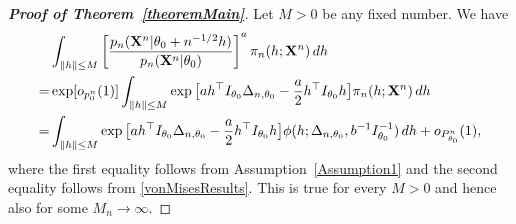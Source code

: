 \documentclass[11pt]{article}
\theoremstyle{plain}
\theoremstyle{definition}
\theoremstyle{remark}
\begin{document}
\begin{appendices}
\begin{proof}[\textbf{Proof of Theorem~\ref{theoremMain}}]
    Let $M>0$ be any fixed number.
    We have
\begin{equation}\label{eq:8}
    \begin{split}
    &\int_{\|h\|\leq M} \left[\frac{p_n(\mathbf{X}^{n}|\theta_0+n^{-1/2}h)}{p_n(\mathbf{X}^{n}|\theta_0)}\right]^a \pi_n (h;\mathbf{X}^{n}) \, dh\\
    =&
    \exp [o_{p^n_0}(1)]\int_{\|h\|\leq M} \exp\big[ a h^\top  I_{\theta_0}\Delta_{n,\theta_0}- \frac{a}{2}h^\top  I_{\theta_0}h\big]\pi_n (h;\mathbf{X}^{n}) \, dh
    \\
    =&\int_{\|h\|\leq M} \exp\big[ a h^\top  I_{\theta_0}\Delta_{n,\theta_0}-\frac{a}{2}h^\top  I_{\theta_0}h\big] \phi(h;\Delta_{n,\theta_0}, b^{-1} I_{\theta_0}^{-1})\, dh
    +o_{P^n_{\theta_0}}(1),
\end{split}
\end{equation}
where the first equality follows from Assumption~\ref{Assumption1} and the second equality follows from \eqref{vonMisesResults}.
This is true for every $M>0$ and hence also for some $M_n\to \infty$.


\end{proof}
\end{appendices}
\end{document}
